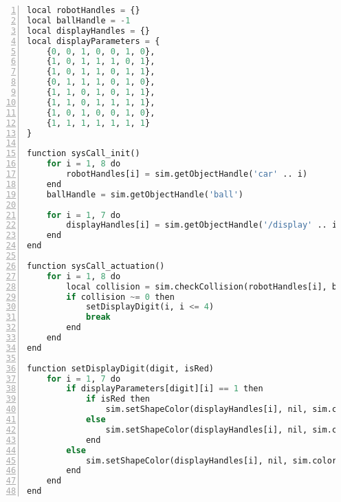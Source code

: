 \begin{lstlisting}[language=Python, frame=single, numbers=left, captionpos=b, basicstyle=\ttfamily\small, showstringspaces=false, breaklines=true, tabsize=4, xleftmargin=15pt]
local robotHandles = {}
local ballHandle = -1
local displayHandles = {}
local displayParameters = {
    {0, 0, 1, 0, 0, 1, 0},
    {1, 0, 1, 1, 1, 0, 1},
    {1, 0, 1, 1, 0, 1, 1},
    {0, 1, 1, 1, 0, 1, 0},
    {1, 1, 0, 1, 0, 1, 1},
    {1, 1, 0, 1, 1, 1, 1},
    {1, 0, 1, 0, 0, 1, 0},
    {1, 1, 1, 1, 1, 1, 1}
}
 
function sysCall_init()
    for i = 1, 8 do
        robotHandles[i] = sim.getObjectHandle('car' .. i)
    end
    ballHandle = sim.getObjectHandle('ball')
 
    for i = 1, 7 do
        displayHandles[i] = sim.getObjectHandle('/display' .. i)
    end
end
 
function sysCall_actuation()
    for i = 1, 8 do
        local collision = sim.checkCollision(robotHandles[i], ballHandle)
        if collision ~= 0 then
            setDisplayDigit(i, i <= 4)
            break
        end
    end
end
 
function setDisplayDigit(digit, isRed)
    for i = 1, 7 do
        if displayParameters[digit][i] == 1 then
            if isRed then
                sim.setShapeColor(displayHandles[i], nil, sim.colorcomponent_ambient_diffuse, {1, 0, 0})
            else
                sim.setShapeColor(displayHandles[i], nil, sim.colorcomponent_ambient_diffuse, {0, 1, 0})
            end
        else
            sim.setShapeColor(displayHandles[i], nil, sim.colorcomponent_ambient_diffuse, {0, 0, 0})
        end
    end
end
\end{lstlisting}